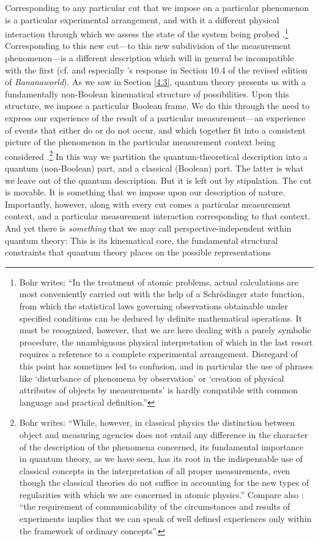 Corresponding to any particular cut that we impose on a particular phenomenon is a particular experimental arrangement, and with it a different physical interaction through which we assess the state of the system being probed \citep[cf.][pp. 392--393]{Bohr 1958}.\footnote{Bohr writes: ``In the treatment of atomic problems, actual calculations are most conveniently carried out with the help of a Schr\"odinger state function, from which the statistical laws governing observations obtainable under specified conditions can be deduced by definite mathematical operations. It must be recognized, however, that we are here dealing with a purely symbolic procedure, the unambiguous physical interpretation of which in the last resort requires a reference to a complete experimental arrangement. Disregard of this point has sometimes led to confusion, and in particular the use of phrases like `disturbance of phenomena by observation' or `creation of physical attributes of objects by measurements' is hardly compatible with common language and practical definition.''} Corresponding to this new cut---to this new subdivision of the measurement phenomenon---is a different description which will in general be incompatible with the first (cf. \citet{Frauchiger and Renner 2018} and especially \citeauthor[]{Bub 2016}'s response in Section 10.4 of the revised edition of \emph{Bananaworld}). As we saw in Section \ref{4.3}, quantum theory presents us with a fundamentally non-Boolean kinematical structure of possibilities. Upon this structure, we impose a particular Boolean frame. We do this through the need to express our experience of the result of a particular measurement---an experience of events that either do or do not occur, and which together fit into a consistent picture of the phenomenon in the particular measurement context being considered \citep[cf.][p. 701]{Bohr 1935}.\footnote{Bohr writes: ``While, however, in classical physics the distinction between object and measuring agencies does not entail any difference in the character of the description of the phenomena concerned, its fundamental importance in quantum theory, as we have seen, has its root in the indispensable use of classical concepts in the interpretation of all proper measurements, even though the classical theories do not suffice in accounting for the new types of regularities with which we are concerned in atomic physics.'' Compare also \citet[p. 293]{Bohr 1937}: ``the requirement of communicability of the circumstances and results of experiments implies that we can speak of well defined experiences only within the framework of ordinary concepts''.} In this way we partition the quantum-theoretical description into a quantum (non-Boolean) part, and a classical (Boolean) part. The latter is what we leave out of the quantum description. But it is left out by stipulation. The cut is movable. It is something that we impose upon our description of nature. Importantly, however, along with every cut comes a particular measurement context, and a particular measurement interaction corresponding to that context. And yet there is \emph{something} that we may call perspective-independent within quantum theory: This is its kinematical core, the fundamental structural constraints that quantum theory places on the possible representations 